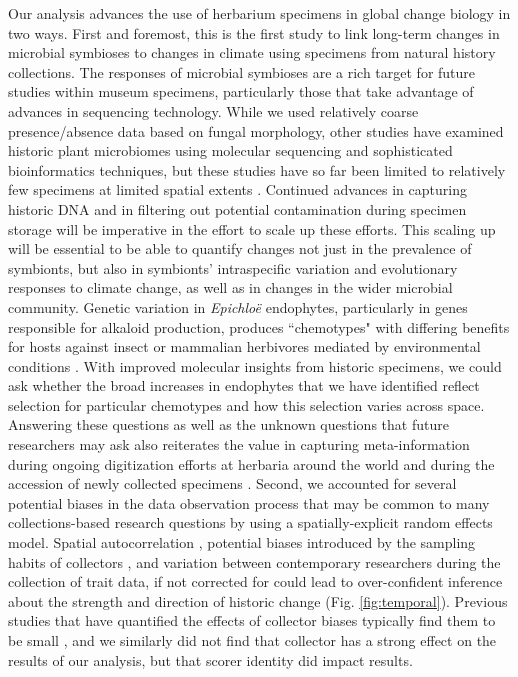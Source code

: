 \documentclass[11pt]{article}
\let\cite\citep
\begin{document}
Our analysis advances the use of herbarium specimens in global change biology in two ways. 
First and foremost, this is the first study to link long-term changes in microbial symbioses to changes in climate using specimens from natural history collections.
The responses of microbial symbioses are a rich target for future studies within museum specimens, particularly those that take advantage of advances in sequencing technology.
While we used relatively coarse presence/absence data based on fungal morphology, other studies have examined historic plant microbiomes using molecular sequencing and sophisticated bioinformatics techniques, but these studies have so far been limited to relatively few specimens at limited spatial extents \cite{yoshida2015computational,heberling2019utilizing, bieker2020metagenomic,gross2021hidden,bradshaw2021global}. 
Continued advances in capturing historic DNA and in filtering out potential contamination during specimen storage \citep{daru2019novel,bakker2020herbarium,raxworthy2021mining} will be imperative in the effort to scale up these efforts. 
This scaling up will be essential to be able to quantify changes not just in the prevalence of symbionts, but also in symbionts' intraspecific variation and evolutionary responses to climate change, as well as  in changes in the wider microbial community. 
Genetic variation in \emph{Epichloë} endophytes, particularly in genes responsible for alkaloid production, produces ``chemotypes" with differing benefits for hosts against insect or mammalian herbivores mediated by environmental conditions \cite{schardl2012chemotypic,saikkonen2013chemical}.  
With improved molecular insights from historic specimens, we could ask whether the broad increases in endophytes that we have identified reflect selection for particular chemotypes and how this selection varies across space.
Answering these questions as well as the unknown questions that future researchers may ask also reiterates the value in capturing meta-information during ongoing digitization efforts at herbaria around the world and during the accession of newly collected specimens \citep{lendemer2020extended,edwards2024university}.
Second, we accounted for several potential biases in the data observation process that may be common to many collections-based research questions by using a spatially-explicit random effects model. 
Spatial autocorrelation \cite{willems2022forest}, potential biases introduced by the sampling habits of collectors \citep{daru2018widespread}, and variation between contemporary researchers during the collection of trait data, if not corrected for could lead to over-confident inference about the strength and direction of historic change (Fig. \ref{fig:temporal}).
Previous studies that have quantified the effects of collector biases typically find them to be small  \cite{davis2015herbarium,meineke2019herbarium}, and we similarly did not find that collector has a strong effect on the results of our analysis, but that scorer identity did impact results.
\end{document}
